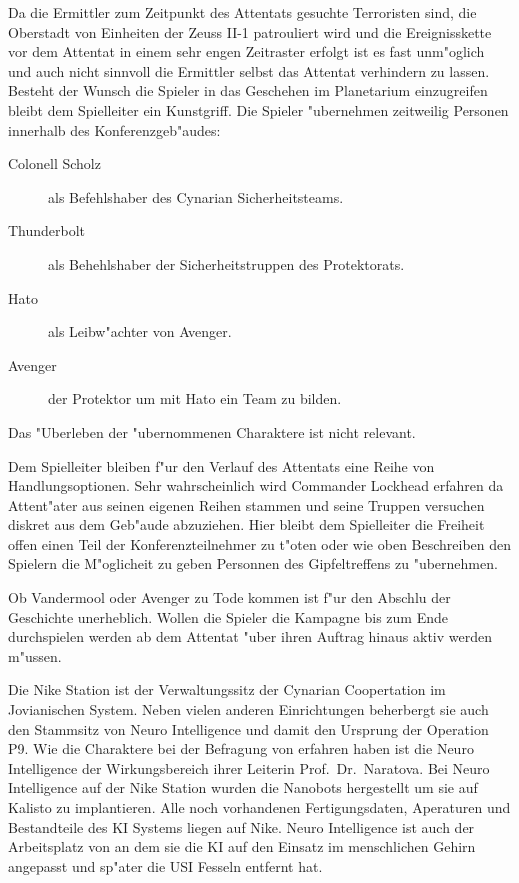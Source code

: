 Da die Ermittler zum Zeitpunkt des Attentats gesuchte Terroristen sind, die Oberstadt von Einheiten der Zeuss II-1 patrouliert wird und die
Ereignisskette vor dem Attentat in einem sehr engen Zeitraster erfolgt ist es fast unm"oglich und auch nicht sinnvoll die Ermittler selbst das Attentat verhindern zu lassen. Besteht der Wunsch die Spieler in das Geschehen im Planetarium einzugreifen bleibt dem Spielleiter ein Kunstgriff. Die Spieler "ubernehmen zeitweilig Personen innerhalb des Konferenzgeb"audes:

\begin{description}
	\item[Colonell Scholz] als Befehlshaber des Cynarian Sicherheitsteams.
	\item[Thunderbolt] als Behehlshaber der Sicherheitstruppen des Protektorats.
	\item[Hato] als Leibw"achter von Avenger.
	\item[Avenger] der Protektor um mit Hato ein Team zu bilden.
\end{description}

Das "Uberleben der "ubernommenen Charaktere ist nicht relevant.

\begin{remarks}
	Dem Spielleiter bleiben f"ur den Verlauf des Attentats eine Reihe von Handlungsoptionen. Sehr wahrscheinlich wird Commander Lockhead erfahren da\3 Attent"ater aus seinen eigenen Reihen stammen und seine Truppen versuchen diskret aus dem Geb"aude abzuziehen. Hier bleibt dem Spielleiter die Freiheit offen einen Teil der Konferenzteilnehmer zu t"oten oder wie oben Beschreiben den Spielern die M"oglicheit zu geben Personnen des Gipfeltreffens zu "ubernehmen.
	
	Ob Vandermool oder Avenger zu Tode kommen ist f"ur den Abschlu\3 der Geschichte unerheblich. Wollen die Spieler die Kampagne bis zum Ende durchspielen werden ab dem Attentat "uber ihren Auftrag hinaus aktiv werden m"ussen.
\end{remarks}



Die Nike Station ist der Verwaltungssitz der Cynarian Coopertation im Jovianischen System. Neben vielen anderen Einrichtungen beherbergt sie auch den Stammsitz von Neuro Intelligence und damit den Ursprung der Operation P9. Wie die Charaktere bei der Befragung von \ml{} erfahren haben ist die Neuro Intelligence der Wirkungsbereich ihrer Leiterin Prof.~Dr.~Naratova. Bei Neuro Intelligence auf der Nike Station wurden die Nanobots hergestellt um sie auf Kalisto zu implantieren. Alle noch vorhandenen Fertigungsdaten, Aperaturen und Bestandteile des KI Systems liegen auf Nike. Neuro Intelligence ist auch der Arbeitsplatz von \ml{} an dem sie die KI auf den Einsatz im menschlichen Gehirn angepasst und sp"ater die USI Fesseln entfernt hat.

